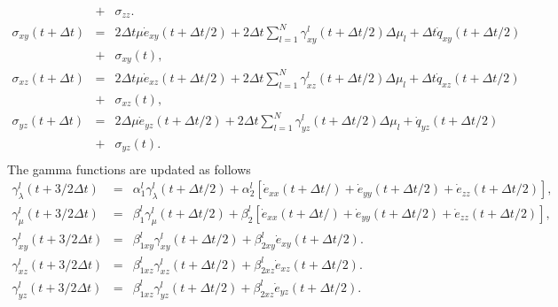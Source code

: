 \documentclass[11pt]{article}
\begin{document}
\begin{eqnarray}
                          & + & \sigma_{zz}.\\
%
  \sigma_{xy}(t+\Delta t) & = & 
                2\Delta t\mu \dot{e}_{xy}(t+\Delta t/2) 
              + 2\Delta t\sum_{l=1}^N\gamma^l_{xy}
                (t+\Delta t/2)\Delta\mu_l+
                \Delta t \dot{q}_{xy}(t+\Delta t/2) \nonumber\\
                          & + & 
  \sigma_{xy}(t)                                                 \nonumber,\\
  \sigma_{xz}(t+\Delta t) & = & 2\Delta t\mu \dot{e}_{xz}(t+\Delta t/2) 
                            + 2\Delta t \sum_{l=1}^N\gamma^l_{xz}
                               (t+\Delta t/2)\Delta\mu_l+
                               \Delta t \dot{q}_{xz}(t+\Delta t/2)\nonumber\\ 
                          & +& \sigma_{xz}(t),\\
  \sigma_{yz}(t+\Delta t) & = & 2\Delta \mu \dot{e}_{yz}(t+\Delta t/2) 
                            + 2\Delta t\sum_{l=1}^N\gamma^l_{yz}
                               (t+\Delta t/2)\Delta\mu_l
                           +\dot{q}_{yz}(t+\Delta t/2)            \nonumber\\
                          & +& \sigma_{yz}(t)\nonumber.\\
                          \label{eq:stress}
\end{eqnarray} 
The gamma functions are updated as follows
\begin{eqnarray}
\gamma^l_{\lambda}(t+3/2\Delta t)  & = &\alpha^l_1 \gamma^l_{\lambda}(
                      t+\Delta t/2) 
                      + \alpha^l_2\left[ \dot{e}_{xx}(t+\Delta t/)
                      + \dot{e}_{yy}(t+\Delta t/2)
                      +\dot{e}_{zz}(t+\Delta t/2)\right] ,      \nonumber \\
\gamma^l_{\mu}(t+3/2\Delta t)     & = &\beta^l_1 \gamma^l_{\mu}(t+\Delta t/2) 
                      + \beta^l_2\left[ \dot{e}_{xx}(t+\Delta t/)
                      + \dot{e}_{yy}(t+\Delta t/2)
                     +\dot{e}_{zz}(t+\Delta t/2)\right] ,        \nonumber \\
\gamma^l_{xy}(t+3/2\Delta t)      & = &\beta^l_{1xy} \gamma^l_{xy}
                                     (t + \Delta t/2) 
                        + \beta^l_{2xy}\dot{e}_{xy}(t+\Delta t/2).\nonumber\\
\gamma^l_{xz}(t+3/2\Delta t)  & = &\beta^l_{1xz} \gamma^l_{xz}(t + \Delta t/2) 
                        + \beta^l_{2xz}\dot{e}_{xz}(t+\Delta t/2). \nonumber\\
\gamma^l_{yz}(t+3/2\Delta t)  & = &\beta^l_{1xz} \gamma^l_{yz}(t + \Delta t/2) 
                        + \beta^l_{2xz}\dot{e}_{yz}(t+\Delta t/2). \nonumber\\
\end{eqnarray}
\end{document}
